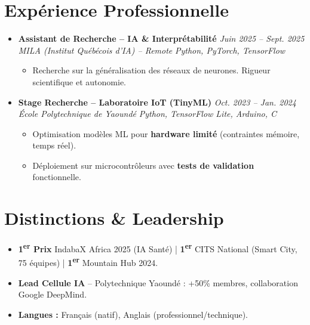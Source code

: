 \documentclass[a4paper,11pt]{article}
\begin{document}
\section{Expérience Professionnelle}
\begin{itemize}[leftmargin=*, label={-}]

\item \textbf{Assistant de Recherche -- IA \& Interprétabilité} \hfill \textit{Juin 2025 -- Sept. 2025} \\
\textit{MILA (Institut Québécois d'IA) -- Remote} \hfill \textit{Python, PyTorch, TensorFlow}
\vspace{-2pt}
    \begin{itemize}[leftmargin=0.4cm, nosep, label=\tiny$\bullet$]
        \item \small{Recherche sur la généralisation des réseaux de neurones. Rigueur scientifique et autonomie.}
    \end{itemize}
\vspace{3pt}

\item \textbf{Stage Recherche -- Laboratoire IoT (TinyML)} \hfill \textit{Oct. 2023 -- Jan. 2024} \\
\textit{École Polytechnique de Yaoundé} \hfill \textit{Python, TensorFlow Lite, Arduino, C}
\vspace{-2pt}
    \begin{itemize}[leftmargin=0.4cm, nosep, label=\tiny$\bullet$]
        \item \small{Optimisation modèles ML pour \textbf{hardware limité} (contraintes mémoire, temps réel).}
        \item \small{Déploiement sur microcontrôleurs avec \textbf{tests de validation} fonctionnelle.}
    \end{itemize}

\end{itemize}

\section{Distinctions \& Leadership}
\begin{itemize}[leftmargin=*, label=\tiny$\bullet$, nosep]
    \item \textbf{1\textsuperscript{er} Prix} IndabaX Africa 2025 (IA Santé) | \textbf{1\textsuperscript{er}} CITS National (Smart City, 75 équipes) | \textbf{1\textsuperscript{er}} Mountain Hub 2024.
    \item \textbf{Lead Cellule IA} -- Polytechnique Yaoundé : +50\% membres, collaboration Google DeepMind.
    \item \textbf{Langues :} Français (natif), Anglais (professionnel/technique).
\end{itemize}
\end{document}
